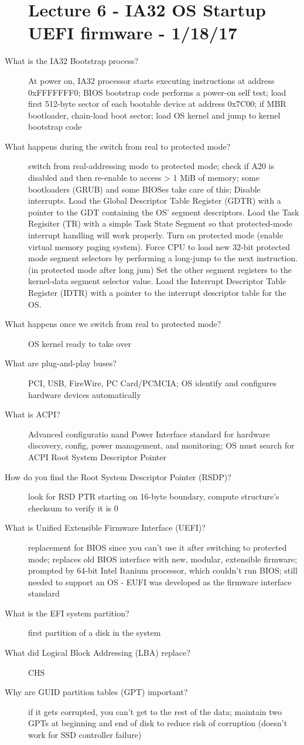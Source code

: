 \documentclass[10pt]{article}
\begin{document}
\begin{description}
\section{Lecture 6 - IA32 OS Startup UEFI firmware - 1/18/17}
\item[What is the IA32 Bootstrap process?]
  At power on, IA32 processor starts executing instructions at address 0xFFFFFFF0;
  BIOS bootstrap code performs a power-on self test;
  load first 512-byte sector of each bootable device at address 0x7C00;
  if MBR bootloader, chain-load boot sector;
  load OS kernel and jump to kernel bootstrap code
\item[What happens during the switch from real to protected mode?]
  switch from real-addressing mode to protected mode;
  check if A20 is disabled and then re-enable to access > 1 MiB of memory;
  some bootloaders (GRUB) and some BIOSes take care of this;
  Disable interrupts.
  Load the Global Descriptor Table Register (GDTR) with a pointer to the GDT containing the OS' segment descriptors.
  Load the Task Regisiter (TR) with a simple Task State Segment so that protected-mode interrupt handling will work properly.
  Turn on protected mode (enable virtual memory paging system).
  Force CPU to load new 32-bit protected mode segment selectors by performing a long-jump to the next instruction. (in protected mode after long jum)
  Set the other segment registers to the kernel-data segment selector value.
  Load the Interrupt Descriptor Table Register (IDTR) with a pointer to the interrupt descriptor table for the OS.
\item[What happens once we switch from real to protected mode?]
  OS kernel ready to take over
\item[What are plug-and-play buses?]
  PCI, USB, FireWire, PC Card/PCMCIA; OS identify and configures hardware devices automatically
\item[What is ACPI?]
  Advanced configuratio nand Power Interface standard for hardware discovery, config, power management, and monitoring;
  OS must search for ACPI Root System Descriptor Pointer
\item[How do you find the Root System Descriptor Pointer (RSDP)?]
  look for RSD PTR starting on 16-byte boundary, compute structure's checksum to verify it is 0
\item[What is Unified Extensible Firmware Interface (UEFI)?]
  replacement for BIOS since you can't use it after switching to protected mode;
  replaces old BIOS interface with new, modular, extensible firmware;
  prompted by 64-bit Intel Itanium processor, which couldn't run BIOS;
  still needed to support an OS - EUFI was developed as the firmware interface standard
\item[What is the EFI system partition?]
  first partition of a disk in the system
\item[What did Logical Block Addressing (LBA) replace?]
  CHS
\item[Why are GUID partition tables (GPT) important?]
  if it gets corrupted, you can't get to the rest of the data;
  maintain two GPTs at beginning and end of disk to reduce risk of corruption (doesn't work for SSD controller failure)
\end{description}
\end{document}
